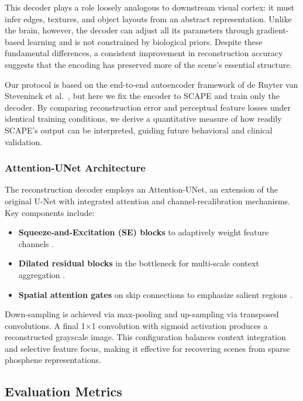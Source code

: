 This decoder plays a role loosely analogous to downstream visual cortex: it must infer edges, textures, and object layouts from an abstract representation. Unlike the brain, however, the decoder can adjust all its parameters through gradient-based learning and is not constrained by biological priors. Despite these fundamental differences, a consistent improvement in reconstruction accuracy suggests that the encoding has preserved more of the scene’s essential structure.

Our protocol is based on the end-to-end autoencoder framework of de Ruyter van Steveninck et al.\ \cite{deRuytervanSteveninck2020}, but here we fix the encoder to SCAPE and train only the decoder. By comparing reconstruction error and perceptual feature losses under identical training conditions, we derive a quantitative measure of how readily SCAPE’s output can be interpreted, guiding future behavioral and clinical validation.  


\subsubsection{Attention-UNet Architecture}
The reconstruction decoder employs an Attention-UNet, an extension of the original U-Net \cite{Ronneberger2015} with integrated attention and channel-recalibration mechanisms. Key components include:

\begin{itemize}
  \item \textbf{Squeeze-and-Excitation (SE) blocks} to adaptively weight feature channels \cite{Hu2018}.
  \item \textbf{Dilated residual blocks} in the bottleneck for multi-scale context aggregation \cite{Yu2016}.
  \item \textbf{Spatial attention gates} on skip connections to emphasize salient regions \cite{Oktay2018}.
\end{itemize}

Down-sampling is achieved via max-pooling and up-sampling via transposed convolutions. A final 1×1 convolution with sigmoid activation produces a reconstructed grayscale image. This configuration balances context integration and selective feature focus, making it effective for recovering scenes from sparse phosphene representations.  



\subsection{Evaluation Metrics}

